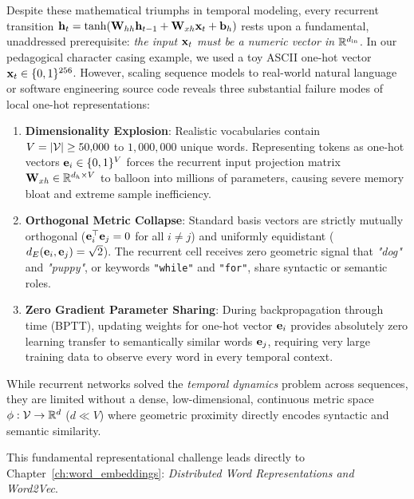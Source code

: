 \documentclass[../../main.tex]{subfiles}
\begin{document}
Despite these mathematical triumphs in temporal modeling, every recurrent transition $\mathbf{h}_t = \tanh(\mathbf{W}_{hh} \mathbf{h}_{t-1} + \mathbf{W}_{xh} \mathbf{x}_t + \mathbf{b}_h)$ rests upon a fundamental, unaddressed prerequisite: \emph{the input $\mathbf{x}_t$ must be a numeric vector in $\mathbb{R}^{d_{\text{in}}}$}. In our pedagogical character casing example, we used a toy ASCII one-hot vector $\mathbf{x}_t \in \{0, 1\}^{256}$. However, scaling sequence models to real-world natural language or software engineering source code reveals three substantial failure modes of local one-hot representations:
\begin{enumerate}
    \item \textbf{Dimensionality Explosion}: Realistic vocabularies contain $V = |\mathcal{V}| \ge 50{,}000$ to $1{,}000{,}000$ unique words. Representing tokens as one-hot vectors $\mathbf{e}_i \in \{0, 1\}^V$ forces the recurrent input projection matrix $\mathbf{W}_{xh} \in \mathbb{R}^{d_h \times V}$ to balloon into millions of parameters, causing severe memory bloat and extreme sample inefficiency.
    \item \textbf{Orthogonal Metric Collapse}: Standard basis vectors are strictly mutually orthogonal ($\mathbf{e}_i^\top \mathbf{e}_j = 0$ for all $i \ne j$) and uniformly equidistant ($d_E(\mathbf{e}_i, \mathbf{e}_j) = \sqrt{2}$). The recurrent cell receives zero geometric signal that \textit{"dog"} and \textit{"puppy"}, or keywords \texttt{"while"} and \texttt{"for"}, share syntactic or semantic roles.
    \item \textbf{Zero Gradient Parameter Sharing}: During backpropagation through time (BPTT), updating weights for one-hot vector $\mathbf{e}_i$ provides absolutely zero learning transfer to semantically similar words $\mathbf{e}_j$, requiring very large training data to observe every word in every temporal context.
\end{enumerate}

While recurrent networks solved the \emph{temporal dynamics} problem across sequences, they are limited without a dense, low-dimensional, continuous metric space $\phi: \mathcal{V} \to \mathbb{R}^d$ ($d \ll V$) where geometric proximity directly encodes syntactic and semantic similarity.

This fundamental representational challenge leads directly to Chapter~\ref{ch:word_embeddings}: \emph{Distributed Word Representations and Word2Vec}.

\clearpage
\thispagestyle{empty}
\null
\clearpage
\end{document}
